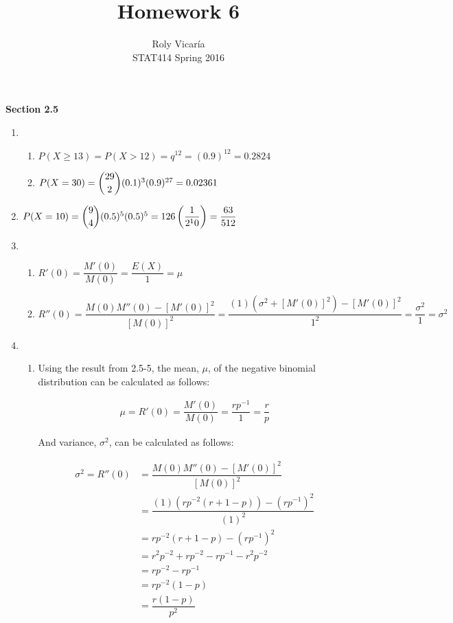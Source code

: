 \documentclass{article}
\title{Homework 6}
\author{Roly Vicar\'ia \\ STAT414 Spring 2016}
\begin{document}
    
    \maketitle
    
    \textbf{Section 2.5}
    \begin{enumerate}
      \item 
	\begin{enumerate}
	 \item 
	  $P(X \ge 13) = P(X > 12) = q^{12} = (0.9)^{12} = 0.2824$
	  
	 \item
	  $P(X = 30) = \dbinom{29}{2}(0.1)^3(0.9)^{27} = 0.02361$
	\end{enumerate}

      
      \item
	$P(X = 10) = \dbinom{9}{4}(0.5)^5(0.5)^5 = 126\left(\dfrac{1}{2^10}\right) = \dfrac{63}{512}$
      \addtocounter{enumi}{2}
      
      \item
	\begin{enumerate}
	 \item 
	  $R'(0) = \dfrac{M'(0)}{M(0)} = \dfrac{E(X)}{1} = \mu$
	  
	 \item
	  $R''(0) = \dfrac{M(0)M''(0) - [M'(0)]^2}{[M(0)]^2} 
	    = \dfrac{(1)(\sigma^2 + [M'(0)]^2) - [M'(0)]^2}{1^2} 
	    = \dfrac{\sigma^2}{1} = \sigma^2$
	\end{enumerate}

      
      \item
	\begin{enumerate}
	 \addtocounter{enumii}{3}
	 \item 
	  Using the result from 2.5-5, the mean, $\mu$, of the negative binomial distribution can be 
	  calculated as follows:
	  
	  \begin{align*}
	   \mu = R'(0) = \dfrac{M'(0)}{M(0)} = \dfrac{rp^{-1}}{1} = \dfrac{r}{p}
	  \end{align*}
	  
	  And variance, $\sigma^2$, can be calculated as follows:
	  
	  \begin{align*}
	   \sigma^2 = R''(0) &= \dfrac{M(0)M''(0) - [M'(0)]^2}{[M(0)]^2} \\
	    &= \dfrac{(1)(rp^{-2}(r+1-p)) - (rp^{-1})^2}{(1)^2} \\
	    &= rp^{-2}(r+1-p) - (rp^{-1})^2 \\
	    &= r^2p^{-2} + rp^{-2} - rp^{-1} - r^2p^{-2} \\
	    &= rp^{-2} - rp^{-1} \\
	    &= rp^{-2}(1 - p) \\
	    &= \dfrac{r(1-p)}{p^2}
	  \end{align*}



\end{enumerate}
\end{enumerate}
\end{document}
